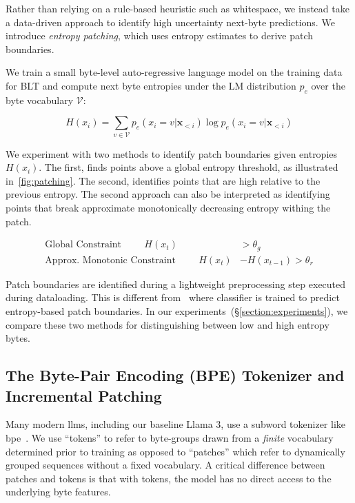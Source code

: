 Rather than relying on a rule-based heuristic such as whitespace, we instead take a data-driven approach to identify high uncertainty next-byte predictions. We introduce \textit{entropy patching}, which uses entropy estimates to derive patch boundaries.

We train a small byte-level auto-regressive language model on the training data for {\textsc BLT} and compute next byte entropies under the LM distribution $p_{e}$ over the byte vocabulary $\mathcal{V}$:

\begin{equation}
H(x_i) = \sum_{v \in \mathcal{V}} p_{e}(x_i=v|\pmb{x}_{<i}) \log p_{e}(x_i=v|\pmb{x}_{<i})
\end{equation}

We experiment with two methods to identify patch boundaries given entropies $H(x_i)$. The first, finds points above a global entropy threshold, as illustrated in~\autoref{fig:patching}. The second, identifies points that are high relative to the previous entropy. The second approach can also be interpreted as identifying points that break approximate monotonically decreasing entropy withing the patch.

\begin{align*}
    \text{Global Constraint}\hspace{1cm}H(x_t)& > \theta_g\\
    \text{Approx. Monotonic Constraint}\hspace{1cm}H(x_t)& - H(x_{t-1}) > \theta_r
\end{align*}

Patch boundaries are identified during a lightweight preprocessing step executed during dataloading. This is different from~\citet{nawrot-etal-2023-efficient} where classifier is trained to predict entropy-based patch boundaries. In our experiments~(\S\ref{section:experiments}), we compare these two methods for distinguishing between low and high entropy bytes. 

\subsection{The Byte-Pair Encoding (BPE) Tokenizer and Incremental Patching}
\label{section:incremental-patching}
\label{section:bpe-patch}

Many modern llms, including our baseline Llama 3, use a subword tokenizer like bpe~\citep{gage1994new, sennrich-etal-2016-neural}. We use ``tokens'' to refer to byte-groups drawn from a \textit{finite} vocabulary determined prior to training as opposed to ``patches'' which refer to dynamically grouped sequences without a fixed vocabulary. A critical difference between patches and tokens is that with tokens, the model has no direct access to the underlying byte features. 

